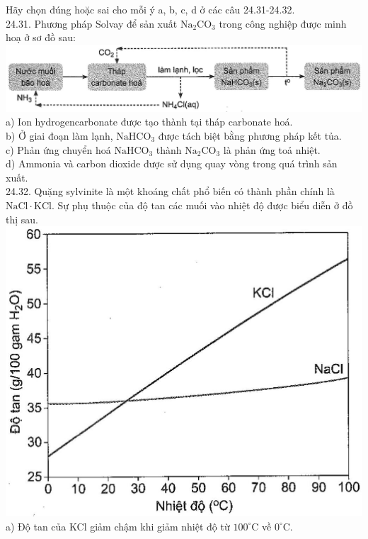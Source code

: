 \documentclass[10pt]{article}
\begin{document}
Hãy chọn đúng hoặc sai cho mỗi ý a, b, c, d ở các câu 24.31-24.32.\\
24.31. Phương pháp Solvay để sản xuất $\mathrm{Na}_{2} \mathrm{CO}_{3}$ trong công nghiệp được minh hoạ ở sơ đồ sau:\\
\includegraphics[max width=\textwidth, center]{2025_10_23_74efce88ce3a451fd6b0g-080}\\
a) Ion hydrogencarbonate được tạo thành tại tháp carbonate hoá.\\
b) Ở giai đoạn làm lạnh, $\mathrm{NaHCO}_{3}$ được tách biệt bằng phương pháp kết tủa.\\
c) Phản ứng chuyển hoá $\mathrm{NaHCO}_{3}$ thành $\mathrm{Na}_{2} \mathrm{CO}_{3}$ là phản ứng toả nhiệt.\\
d) Ammonia và carbon dioxide được sử dụng quay vòng trong quá trình sản xuất.\\
24.32. Quặng sylvinite là một khoáng chất phổ biến có thành phần chính là $\mathrm{NaCl} \cdot \mathrm{KCl}$. Sự phụ thuộc của độ tan các muối vào nhiệt độ được biểu diễn ở đồ thị sau.\\
\includegraphics[max width=\textwidth, center]{2025_10_23_74efce88ce3a451fd6b0g-081}\\
a) Độ tan của KCl giảm chậm khi giảm nhiệt độ từ $100^{\circ} \mathrm{C}$ về $0^{\circ} \mathrm{C}$.\\
\end{document}
